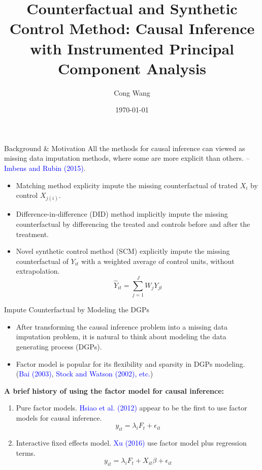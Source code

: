 \documentclass{beamer}
\title{Counterfactual and  Synthetic Control Method: Causal Inference with Instrumented Principal Component Analysis}
\author{Cong Wang}
\institute{Sapienza University of Rome}
\date{\today}
\begin{document}
\begin{frame}
\titlepage
\end{frame}

\begin{frame}{Background \& Motivation}
All the methods for causal inference can viewed as missing data imputation methods, where some are more explicit than others. -- \textcolor{blue}{Imbens and Rubin (2015)}.

\begin{itemize}
    \item Matching method explicity impute the missing counterfactual of trated $X_i$ by control $X_{j(i)}$.
    \item Difference-in-difference (DID) method implicitly impute the missing counterfactual by differencing the treated and controls before and after the treatment.
    \item Novel synthetic control method (SCM) explicitly impute the missing counterfactual of $Y_{it}$ with a weighted average of control units, without extrapolation.
    $$
    \hat{Y}_{it} = \sum_{j=1}^{J} W_{j} Y_{jt}
    $$
\end{itemize}

\end{frame}

\begin{frame}{Impute Counterfactual by Modeling the DGPs}
\begin{itemize}
    \item After transforming the causal inference problem into a missing data imputation problem, it is natural to think about modeling the data generating process (DGPs).
    \item Factor model is popular for its flexibility and sparsity in DGPs modeling. (\textcolor{blue}{Bai (2003)}, \textcolor{blue}{Stock and Watson (2002), etc.})
\end{itemize}

\textbf{A brief history of using the factor model for causal inference:}
\begin{enumerate}
    \item Pure factor models. \textcolor{blue}{Hsiao et al. (2012)} appear to be the first to use factor models for causal inference.
    $$y_{it} = \lambda_i F_t + \epsilon_{it}$$
    \item Interactive fixed effects model. \textcolor{blue}{Xu (2016)} use factor model plus regression terms.
    $$y_{it} = \lambda_{i} F_t + X_{it} \beta + \epsilon_{it}$$
\end{enumerate}
\end{frame}
\end{document}
